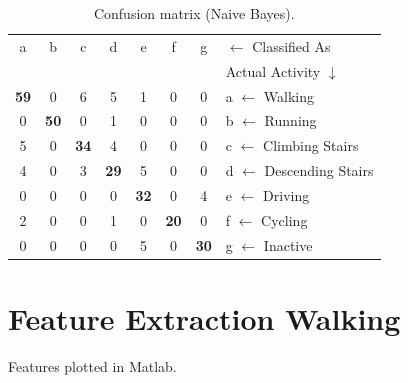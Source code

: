 \documentclass[12pt,a4paper,oneside]{book}
\begin{document}
\begin{table}[!tbh]
\caption{Confusion matrix (Naive Bayes).}
\label{tab:Confusion_Matrix_Naive Bayes}
\centering
\begin{tabular}[width=\columnwidth]{|ccccccc|p{1.5in}|}
\hline
a & b & c & d & e & f & g & $\leftarrow$ Classified As \\
  &   &   &   &   &   &   & Actual Activity $\downarrow$ \\
\hline
\textbf{59} & 0 & 6 & 5 & 1 & 0 & 0 & a $\leftarrow$ Walking \\
0 & \textbf{50} & 0 & 1 & 0 & 0 & 0 & b $\leftarrow$ Running \\
5 & 0 & \textbf{34} & 4 & 0 & 0 & 0 & c $\leftarrow$ Climbing Stairs \\
4 & 0 & 3 & \textbf{29} & 5 & 0 & 0 & d $\leftarrow$ Descending Stairs \\
0 & 0 & 0 & 0 & \textbf{32} & 0 & 4 & e $\leftarrow$ Driving \\
2 & 0 & 0 & 1 & 0 & \textbf{20} & 0 & f $\leftarrow$ Cycling \\
0 & 0 & 0 & 0 & 5 & 0 & \textbf{30} & g $\leftarrow$ Inactive \\
\hline
\end{tabular}
\end{table}


\appendix
\chapter{Feature Extraction Walking}
%
Features plotted in Matlab.






\backmatter
\end{document}
